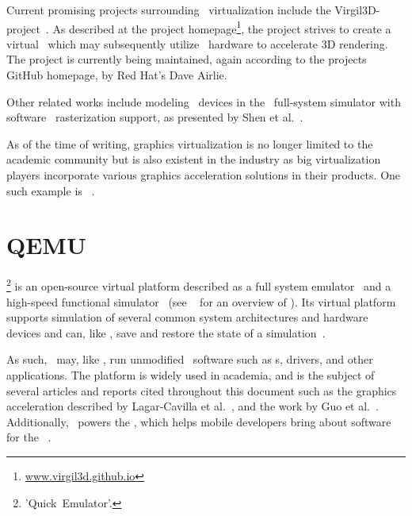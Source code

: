Current promising projects surrounding \dvttermgpu\ virtualization include the Virgil3D-project~.
As described at the project homepage\footnote{\href{http://virgil3d.github.io/}{www.virgil3d.github.io}}, the project strives to create a virtual \dvttermgpu\ which may subsequently utilize \dvttermhost\ hardware to accelerate 3D rendering.
The project is currently being maintained, again according to the projects GitHub homepage, by Red Hat's Dave Airlie.

Other related works include modeling \dvttermgpu\ devices in the \dvttermqemu\ full-system simulator with software \dvttermopengles\ rasterization support, as presented by Shen et al.~.

As of the time of writing, graphics virtualization is no longer limited to the academic community but is also existent in the industry as big virtualization players incorporate various graphics acceleration solutions in their products.
One such example is \dvttermvmware ~.

\section{QEMU}
\label{sec:relatedwork_qemu}
\dvttermqemu \footnote{'Quick~Emulator'.} is an open-source virtual platform described as a full system emulator~ and a high-speed functional simulator~ (see ~ for an overview of \dvttermqemu ).
Its virtual platform supports simulation of several common system architectures and hardware devices and can, like \dvttermsimics , save and restore the state of a simulation~.

As such, \dvttermqemu\ may, like \dvttermsimics , run unmodified \dvttermtarget\ software such as \dvttermos s, drivers, and other applications.
The platform is widely used in academia, and is the subject of several articles and reports cited throughout this document such as the graphics acceleration described by Lagar-Cavilla et al.~, and the work by Guo et al.~.
Additionally, \dvttermqemu\ powers the \dvttermandroidemulator , which helps mobile developers bring about software for the \dvttermandroid\ \dvttermos .

